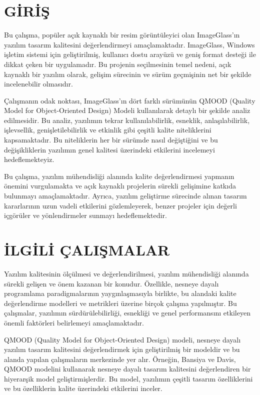 \documentclass[conference]{IEEEtran}
\begin{document}
\IEEEpeerreviewmaketitle
\IEEEpubidadjcol

\section{GİRİŞ}

Bu çalışma, popüler açık kaynaklı bir resim görüntüleyici olan ImageGlass'ın yazılım tasarım kalitesini değerlendirmeyi amaçlamaktadır. ImageGlass, Windows işletim sistemi için geliştirilmiş, kullanıcı dostu arayüzü ve geniş format desteği ile dikkat çeken bir uygulamadır. Bu projenin seçilmesinin temel nedeni, açık kaynaklı bir yazılım olarak, gelişim sürecinin ve sürüm geçmişinin net bir şekilde incelenebilir olmasıdır.

Çalışmanın odak noktası, ImageGlass'ın dört farklı sürümünün QMOOD (Quality Model for Object-Oriented Design) Modeli kullanılarak detaylı bir şekilde analiz edilmesidir. Bu analiz, yazılımın tekrar kullanılabilirlik, esneklik, anlaşılabilirlik, işlevsellik, genişletilebilirlik ve etkinlik gibi çeşitli kalite niteliklerini kapsamaktadır. Bu niteliklerin her bir sürümde nasıl değiştiğini ve bu değişikliklerin yazılımın genel kalitesi üzerindeki etkilerini incelemeyi hedeflemekteyiz.

Bu çalışma, yazılım mühendisliği alanında kalite değerlendirmesi yapmanın önemini vurgulamakta ve açık kaynaklı projelerin sürekli gelişimine katkıda bulunmayı amaçlamaktadır. Ayrıca, yazılım geliştirme sürecinde alınan tasarım kararlarının uzun vadeli etkilerini gözlemleyerek, benzer projeler için değerli içgörüler ve yönlendirmeler sunmayı hedeflemektedir.

\section{İLGİLİ ÇALIŞMALAR}

Yazılım kalitesinin ölçülmesi ve değerlendirilmesi, yazılım mühendisliği alanında sürekli gelişen ve önem kazanan bir konudur. Özellikle, nesneye dayalı programlama paradigmalarının yaygınlaşmasıyla birlikte, bu alandaki kalite değerlendirme modelleri ve metrikleri üzerine birçok çalışma yapılmıştır. Bu çalışmalar, yazılımın sürdürülebilirliği, esnekliği ve genel performansını etkileyen önemli faktörleri belirlemeyi amaçlamaktadır.

QMOOD (Quality Model for Object-Oriented Design) modeli, nesneye dayalı yazılım tasarım kalitesini değerlendirmek için geliştirilmiş bir modeldir ve bu alanda yapılan çalışmaların merkezinde yer alır. Örneğin, Bansiya ve Davis\cite{bansiyadavis}, QMOOD modelini kullanarak nesneye dayalı tasarım kalitesini değerlendiren bir hiyerarşik model geliştirmişlerdir. Bu model, yazılımın çeşitli tasarım özelliklerini ve bu özelliklerin kalite üzerindeki etkilerini inceler.
\end{document}
